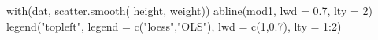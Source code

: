 \begin{Schunk}
\begin{Sinput}
 with(dat, scatter.smooth( height, weight))
 abline(mod1, lwd = 0.7, lty = 2)
 legend("topleft", legend = c("loess","OLS"), lwd = c(1,0.7), lty = 1:2)
\end{Sinput}
\end{Schunk}
